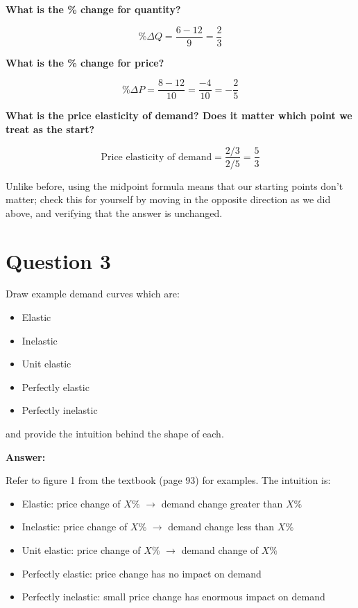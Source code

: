 \documentclass[12pt]{article}
\begin{document}
\textbf{What is the \% change for quantity?}

$$ \% \Delta Q = \dfrac{6-12}{9} = \dfrac{2}{3} $$

\textbf{What is the \% change for price?}

$$ \% \Delta P = \dfrac{8-12}{10} = \dfrac{-4}{10} = -\dfrac{2}{5}$$

\textbf{What is the price elasticity of demand? Does it matter which point we treat as the start?}

$$\text{Price elasticity of demand} = \dfrac{2/3}{2/5} = \dfrac{5}{3} $$

Unlike before, using the midpoint formula means that our starting points don't matter; check this for yourself by moving in the opposite direction as we did above, and verifying that the answer is unchanged.


\section*{Question 3}
Draw example demand curves which are:
\begin{itemize}
 \item Elastic
 \item Inelastic
 \item Unit elastic
 \item Perfectly elastic
 \item Perfectly inelastic
\end{itemize}
and provide the intuition behind the shape of each.

\vspace{2mm}

\textbf{Answer:}

\vspace{2mm}

Refer to figure 1 from the textbook (page 93) for examples. The intuition is:
\begin{itemize}
    \item Elastic: price change of $X\%$ $\to$ demand change greater than $X\%$ 
    \item Inelastic: price change of $X\%$ $\to$ demand change less than $X\%$ 
    \item Unit elastic: price change of $X\%$ $\to$ demand change of $X\%$
    \item Perfectly elastic: price change has no impact on demand
    \item Perfectly inelastic: small price change has enormous impact on demand
   \end{itemize}
\end{document}

